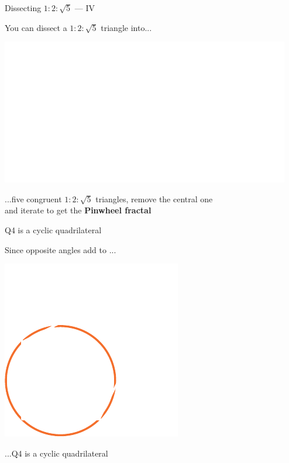 \documentclass[14pt]{beamer}
\begin{document}

    \begin{frame}{Dissecting $1\!\!:\!\!2\!\!:\!\!\sqrt{5}$ --- IV}
        \begin{center}
            You can dissect a $1\!\!:\!\!2\!\!:\!\!\sqrt{5}$ triangle into...

            \bigskip \bigskip

            \includegraphics[height=18ex]{figures/figure006h.pdf}

            \bigskip \bigskip

            ...five congruent $1\!\!:\!\!2\!\!:\!\!\sqrt{5}$ triangles, remove the central one\\and iterate to get the \textbf{Pinwheel fractal}
        \end{center}
    \end{frame}


    \begin{frame}{Q4 is a cyclic quadrilateral}
        \begin{center}
            Since opposite angles add to \textpi...
        \end{center}
        \vspace{0.90em}
        \hspace{5.25em} \includegraphics[scale=1.]{figures/figure019b.pdf} \\
        \begin{center}
            ...Q4 is a cyclic quadrilateral
        \end{center}
    \end{frame}
\end{document}
